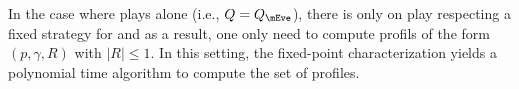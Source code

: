 \begin{remark}
In the case where \Eve plays alone (i.e., $Q=Q_\mEve$), there is only on play respecting a fixed strategy for \Eve and as a result, one only need to compute profils of the form $(p,\gamma,R)$ with $|R|\leq 1$. In this setting, the fixed-point characterization yields a polynomial time algorithm to compute the set of profiles.
\end{remark}






